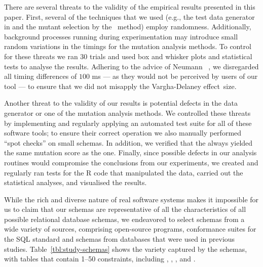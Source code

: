  There are several threats to the validity of the empirical results presented in this paper. First, several of the techniques that we used (e.g., the test data generator in \SA and the mutant selection by the \tcm~method) employ randomness. Additionally, background processes running during experimentation may introduce small random variations in the timings for the mutation analysis methods. To control for these threats we ran 30 trials and used box and whisker plots and statistical tests to analyse the results. Adhering to the advice of Neumann \etal~\cite{Neumann2015},
%
we disregarded all timing differences of $100$ ms --- as they would not be perceived by users of our tool --- to ensure that we did not misapply the Vargha-Delaney \mbox{effect size}.



Another threat to the validity of our results is potential defects in the data generator or one of the mutation analysis methods. We controlled these threats by implementing and regularly applying an automated test suite for all of these software tools; to ensure their correct operation we also manually performed ``spot checks'' on small schemas. In addition, we verified that the \vma always yielded the same mutation score as the \Original one. Finally, since possible defects in our analysis routines would compromise the conclusions from our experiments, we created and regularly ran tests for the R code that manipulated the data, carried out the statistical analyses, and visualised the results.


While the rich and diverse nature of real software systems makes it impossible for us to claim that our schemas are representative of all the characteristics of all possible relational database schemas, we endeavored to select schemas from a wide variety of sources, comprising open-source programs, conformance suites for the SQL standard and schemas from databases that were used in previous studies. Table~\ref{tbl:study-schemas} shows the variety captured by the schemas, with tables that contain 1--50 constraints, including \CHECKs, \FKs, \PKs, \NOTNULLs and \UNIQUEs.
